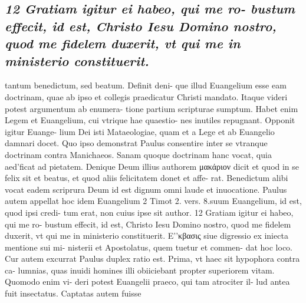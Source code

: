 \documentclass{article}
\begin{document}
\begin{pages}
\subsection*{\textit{12 Gratiam igitur ei habeo, qui me ro- bustum effecit, id est, Christo Iesu Domino nostro, quod me fidelem duxerit, vt qui me in ministerio constituerit.}}tantum benedictum, sed beatum. Definit deni- que illud Euangelium esse eam doctrinam, quae ab ipso et collegis praedicatur Christi mandato. Itaque videri potest argumentum ab enumera- tione partium scripturae sumptum. Habet enim Legem et Euangelium, cui vtrique hae quaestio- nes inutiles repugnant. Opponit igitur Euange- lium Dei isti Mataeologiae, quam et a Lege et ab Euangelio damnari docet. Quo ipso demonstrat Paulus consentire inter se vtranque doctrinam contra Manichaeos. Sanam quoque doctrinam hanc vocat, quia aed’ficat ad pietatem. Denique Deum illius authorem μακάριον dicit et quod in se felix sit et beatus, et quod aliis felicitatem donet et affe- rat. Benedictum alibi vocat eadem scriprura Deum id est dignum omni laude et inuocatione. Paulus autem appellat hoc idem Euangelium 2 Timot 2. vers. 8.suum Euangelium, id est, quod ipsi credi- tum erat, non cuius ipse sit author. 12 Gratiam igitur ei habeo, qui me ro- bustum effecit, id est, Christo Iesu Domino nostro, quod me fidelem duxerit, vt qui me in ministerio constituerit. E’'κβασις siue digressio ex iniecta mentione sui mi- nisterii et Apostolatus, quem tuetur et commen- dat hoc loco. Cur autem excurrat Paulus duplex ratio est. Prima, vt haec sit hypophora contra ca- lumnias, quas inuidi homines illi obiiciebant propter superiorem vitam. Quomodo enim vi- deri potest Euangelii praeco, qui tam atrociter il- lud antea fuit insectatus. Captatas autem fuisse  \pend

\end{pages}
\end{document}
